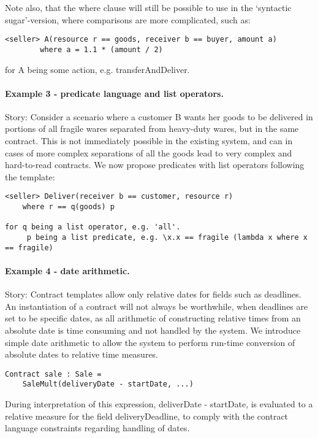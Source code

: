 \documentclass[10pt,a4paper,final,oneside,openany,article]{memoir}
\begin{document}
Note also, that the where clause will still be possible to use in the ‘syntactic
sugar’-version, where comparisons are more complicated, such as:

\begin{lstlisting}
<seller> A(resource r == goods, receiver b == buyer, amount a)
        where a = 1.1 * (amount / 2)
\end{lstlisting}

for A being some action, e.g. transferAndDeliver.


\paragraph{Example 3 - predicate language and list operators.}
Story: Consider a scenario where a customer B wants her goods to be delivered in
portions of all fragile wares separated from heavy-duty wares, but in the same
contract. This is not immediately possible in the existing system, and can in
cases of more complex separations of all the goods lead to very complex and
hard-to-read contracts. We now propose predicates with list operators following
the template:

\begin{lstlisting}
<seller> Deliver(receiver b == customer, resource r)
    where r == q(goods) p

for q being a list operator, e.g. 'all'.
     p being a list predicate, e.g. \x.x == fragile (lambda x where x == fragile)
\end{lstlisting}

\paragraph{Example 4 - date arithmetic.}
Story: Contract templates allow only relative dates for fields such as
deadlines. An instantiation of a contract will not always be worthwhile, when
deadlines are set to be specific dates, as all arithmetic of constructing
relative times from an absolute date is time consuming and not handled by the
system. We introduce simple date arithmetic to allow the system to perform
run-time conversion of absolute dates to relative time measures.

\begin{lstlisting}
Contract sale : Sale =
    SaleMult(deliveryDate - startDate, ...)
\end{lstlisting}

During interpretation of this expression, deliverDate - startDate, is evaluated
to a relative measure for the field deliveryDeadline, to comply with the
contract language constraints regarding handling of dates.
\end{document}
